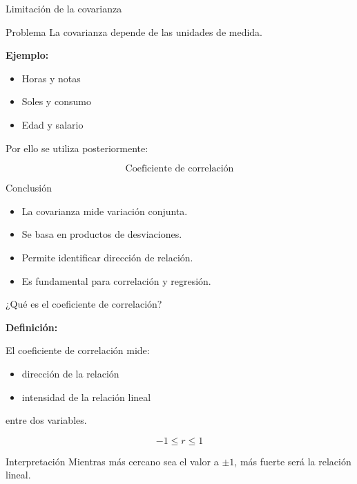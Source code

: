 \documentclass{beamer}
\begin{document}
\begin{frame}{Limitación de la covarianza}

\begin{block}{Problema}
La covarianza depende de las unidades de medida.
\end{block}

\vspace{0.4cm}

\textbf{Ejemplo:}

\begin{itemize}
\item Horas y notas
\item Soles y consumo
\item Edad y salario
\end{itemize}

\vspace{0.3cm}

Por ello se utiliza posteriormente:

\[
\text{Coeficiente de correlación}
\]

\end{frame}

\begin{frame}{Conclusión}

\begin{itemize}
\item La covarianza mide variación conjunta.
\item Se basa en productos de desviaciones.
\item Permite identificar dirección de relación.
\item Es fundamental para correlación y regresión.
\end{itemize}

\end{frame}

\begin{frame}{¿Qué es el coeficiente de correlación?}

\textbf{Definición:}

El coeficiente de correlación mide:

\begin{itemize}
\item dirección de la relación
\item intensidad de la relación lineal
\end{itemize}

entre dos variables.

\vspace{0.4cm}

\[
-1 \leq r \leq 1
\]

\vspace{0.3cm}

\begin{block}{Interpretación}
Mientras más cercano sea el valor a \(\pm1\), más fuerte será la relación lineal.
\end{block}

\end{frame}
\end{document}
